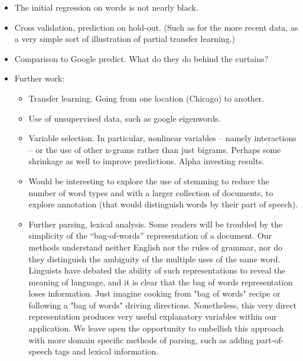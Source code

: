 \documentclass[12pt]{article}
\begin{document}
 \begin{itemize}
 
 \item The initial regression on words is not nearly black.

 \item Cross validation, prediction on hold-out.  (Such as for the more recent data, as a very simple sort of illustration of partial transfer learning.)
 
 \item Comparison to Google predict.  What do they do behind the curtains?
 
 
 \item Further work:
   \begin{itemize}

   \item Transfer learning.  Going from one location (Chicago) to another.
   
   \item Use of unsupervised data, such as google eigenwords.
   
   \item Variable selection.  In particular, nonlinear variables -- namely interactions -- or the use of other n-grams rather than just bigrams.  Perhaps some shrinkage as well to improve predictions.  Alpha investing results.
   
 \item Would be interesting to explore the use of stemming to reduce the number of word types and with a larger collection of documents, to explore annotation (that would distinguish words by their part of speech).

   \item Further parsing, lexical analysis.  Some readers will be troubled by the simplicity of the
 ``bag-of-words'' representation of a document.  Our methods understand neither
 English nor the rules of grammar, nor do they distinguish the ambiguity of the
 multiple uses of the same word.  Linguists have debated the ability of such
 representations to reveal the meaning of language, and it is clear that the bag of words representation loses information.  Just imagine cooking from "bag of words" recipe or following a "bag of words" driving directions.  Nonetheless,
 this very direct representation produces very useful explanatory variables
 within our application.  We leave open the opportunity to embellish this
 approach with more domain specific methods of parsing, such as adding
 part-of-speech tags and lexical information.

   \end{itemize}

\end{itemize}
\end{document}
